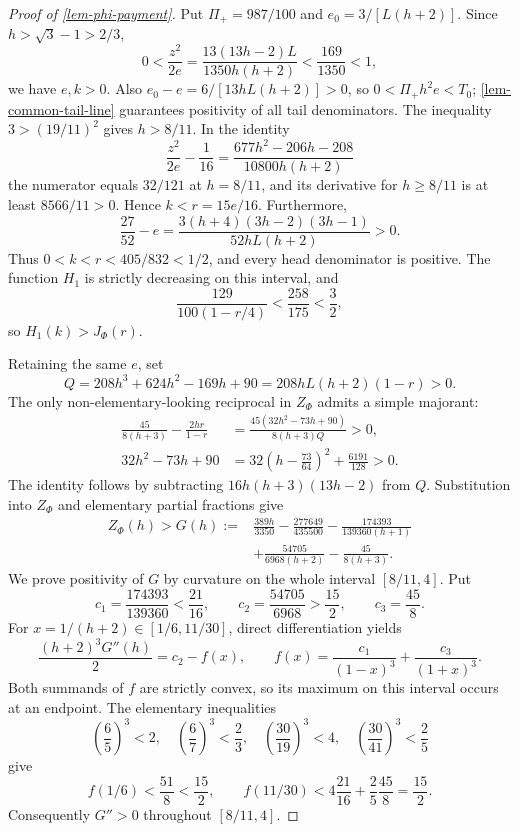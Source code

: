 \documentclass[11pt,a4paper]{article}
\theoremstyle{proofmanuscript}
\begin{document}
\begin{proof}[Proof of \ref{lem-phi-payment}]

Put \(\Pi_+=987/100\) and \(e_0=3/[L(h+2)]\). Since \(h>\sqrt3-1>2/3\), \[
0<\frac{z^2}{2e}=\frac{13(13h-2)L}{1350h(h+2)}<\frac{169}{1350}<1,
\] we have \(e,k>0\). Also \(e_0-e=6/[13hL(h+2)]>0\), so \(0<\Pi_+h^2e<T_0\); \ref{lem-common-tail-line} guarantees positivity of all tail denominators. The inequality \(3>(19/11)^2\) gives \(h>8/11\). In the identity \[
\frac{z^2}{2e}-\frac1{16}
=\frac{677h^2-206h-208}{10800h(h+2)}
\] the numerator equals \(32/121\) at \(h=8/11\), and its derivative for \(h\ge8/11\) is at least \(8566/11>0\). Hence \(k<r=15e/16\). Furthermore, \[
\frac{27}{52}-e
=\frac{3(h+4)(3h-2)(3h-1)}{52hL(h+2)}>0.
\] Thus \(0<k<r<405/832<1/2\), and every head denominator is positive. The function \(H_1\) is strictly decreasing on this interval, and \[
\frac{129}{100(1-r/4)}<\frac{258}{175}<\frac32,
\] so \(H_1(k)>J_\Phi(r)\).

Retaining the same \(e\), set \[
Q=208h^3+624h^2-169h+90=208hL(h+2)(1-r)>0.
\] The only non-elementary-looking reciprocal in \(Z_\Phi\) admits a simple majorant: \[
\begin{aligned}
\frac{45}{8(h+3)}-\frac{2hr}{1-r}
&=\frac{45(32h^2-73h+90)}{8(h+3)Q}>0,\\
32h^2-73h+90
&=32\left(h-\frac{73}{64}\right)^2+\frac{6191}{128}>0.
\end{aligned}
\] The identity follows by subtracting \(16h(h+3)(13h-2)\) from \(Q\). Substitution into \(Z_\Phi\) and elementary partial fractions give \[
\begin{aligned}
Z_\Phi(h)>G(h):={}&\frac{389h}{3350}-\frac{277649}{435500}
-\frac{174393}{139360(h+1)}\\
&+\frac{54705}{6968(h+2)}-\frac{45}{8(h+3)}.
\end{aligned}
\tag{T.4.7}
\] We prove positivity of \(G\) by curvature on the whole interval \([8/11,4]\). Put \[
c_1=\frac{174393}{139360}<\frac{21}{16},\qquad
c_2=\frac{54705}{6968}>\frac{15}{2},\qquad c_3=\frac{45}{8}.
\] For \(x=1/(h+2)\in[1/6,11/30]\), direct differentiation yields \[
\frac{(h+2)^3G''(h)}2
=c_2-f(x),\qquad
f(x)=\frac{c_1}{(1-x)^3}+\frac{c_3}{(1+x)^3}.
\] Both summands of \(f\) are strictly convex, so its maximum on this interval occurs at an endpoint. The elementary inequalities \[
\left(\frac65\right)^3<2,\quad
\left(\frac67\right)^3<\frac23,\quad
\left(\frac{30}{19}\right)^3<4,\quad
\left(\frac{30}{41}\right)^3<\frac25
\] give \[
f(1/6)<\frac{51}{8}<\frac{15}{2},\qquad
f(11/30)<4\frac{21}{16}+\frac25\frac{45}{8}=\frac{15}{2}.
\] Consequently \(G''>0\) throughout \([8/11,4]\).


\end{proof}
\end{document}
